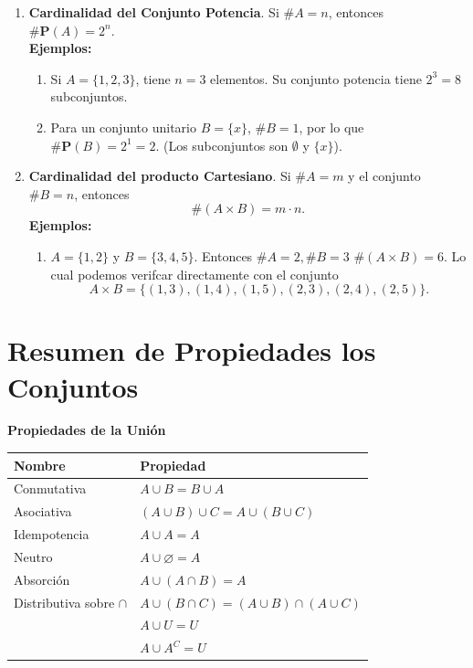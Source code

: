 \documentclass[12pt]{article}
\begin{document}
\begin{enumerate}
    \item \textbf{Cardinalidad del Conjunto Potencia}. Si $\#A = n$, entonces $\#\mathbf{P}(A) = 2^n$.\\
    \textbf{Ejemplos:}
    \begin{enumerate}
        \item Si $A = \{1, 2, 3\}$, tiene $n=3$ elementos. Su conjunto potencia tiene $2^3 = 8$ subconjuntos.
        \item Para un conjunto unitario $B = \{x\}$, $\#B = 1$, por lo que $\#\mathbf{P}(B) = 2^1 = 2$. (Los subconjuntos son $\emptyset$ y $\{x\}$).
    \end{enumerate}
    \item \textbf{Cardinalidad del producto Cartesiano}.
    Si  $\#A=m$  y el conjunto $\#B= n$, entonces
\[
\#(A \times B) = m \cdot n.
\]
\textbf{Ejemplos:}
\begin{enumerate}
    \item  $A = \{1, 2\}$ y $B = \{3, 4, 5\}$. Entonces $\#A = 2,  \#B = 3$  $\#(A \times B) = 6$. Lo cual podemos verifcar directamente con el conjunto 
\[
A \times B = \{(1, 3), (1, 4), (1, 5), (2, 3), (2, 4), (2, 5)\}.
\]


\end{enumerate}
\end{enumerate}
\newpage
\section{Resumen de Propiedades los Conjuntos}


{\large\bfseries Propiedades de la Unión}

\setlength{\tabcolsep}{4pt}
\renewcommand{\arraystretch}{1.1}

\begin{tabularx}{\linewidth}{@{}lX@{}}
\toprule
\textbf{Nombre} & \textbf{Propiedad} \\ \midrule
Conmutativa & $A \cup B = B \cup A$ \\
Asociativa  & $(A \cup B)\cup C = A \cup (B \cup C)$ \\
Idempotencia & $A \cup A = A$ \\
Neutro      & $A \cup \varnothing = A$ \\
Absorción   & $A \cup (A \cap B) = A$ \\
Distributiva sobre $\cap$ & $A \cup (B \cap C) = (A \cup B) \cap (A \cup C)$ \\
   & $A \cup U = U$ \\ 
   & $A\cup A^C=U$\\
\bottomrule
\end{tabularx}
\end{document}
